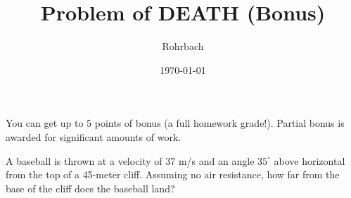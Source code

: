 \documentclass[11pt]{exam}
\title{Problem of DEATH (Bonus)}
\author{Rohrbach}
\date{\today}
\begin{document}
\maketitle

\noindent
You can get up to 5 points of bonus (a full homework grade!).  Partial bonus is awarded for significant amounts of work.

\vspace{2em}

A baseball is thrown at a velocity of 37 m/s and an angle $35^\circ$ above horizontal from the top of a 45-meter cliff.  Assuming no air resistance, how far from the base of the cliff does the baseball land?
\end{document}
